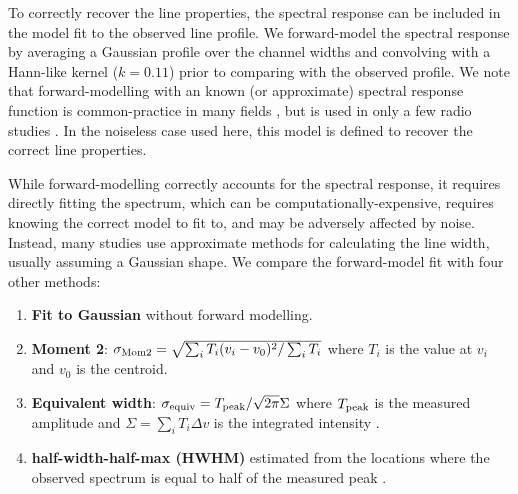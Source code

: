 \documentclass{rnaastex}
\begin{document}



To correctly recover the line properties, the spectral response can be included in the model fit to the observed line profile.  We forward-model the spectral response by averaging a Gaussian profile over the channel widths and convolving with a Hann-like kernel ($k=0.11$) prior to comparing with the observed profile.  We note that forward-modelling with an known (or approximate) spectral response function is common-practice in many fields \citep[e.g.,][]{martin2015}, but is used in only a few radio studies \citep{rosolowsky2008}.  In the noiseless case used here, this model is defined to recover the correct line properties.

While forward-modelling correctly accounts for the spectral response, it requires directly fitting the spectrum, which can be computationally-expensive, requires knowing the correct model to fit to, and may be adversely affected by noise.  Instead, many studies use approximate methods for calculating the line width, usually assuming a Gaussian shape. We compare the forward-model fit with four other methods:
\begin{enumerate}
    \item {\bf Fit to Gaussian} without forward modelling.
    \item {\bf Moment 2}: $\sigma_{\rm Mom2}=\sqrt{\sum_i T_i (v_i - v_0)^2 / \sum_i T_i}$ where $T_i$ is the value at $v_i$ and $v_0$ is the centroid.
    \item {\bf Equivalent width}: $\sigma_{\rm equiv} = T_{\rm peak} / \sqrt{2\pi} \Sigma$ where $T_{\rm peak}$ is the measured amplitude and $\Sigma= \sum_i T_i \Delta v$ is the integrated intensity \citep{heyer2001,leroy2016,sun2018}.
    \item {\bf half-width-half-max (HWHM)} estimated from the locations where the observed spectrum is equal to half of the measured peak \citep{stilp2013a,stilp2013b,koch2018}.
\end{enumerate}
\end{document}
